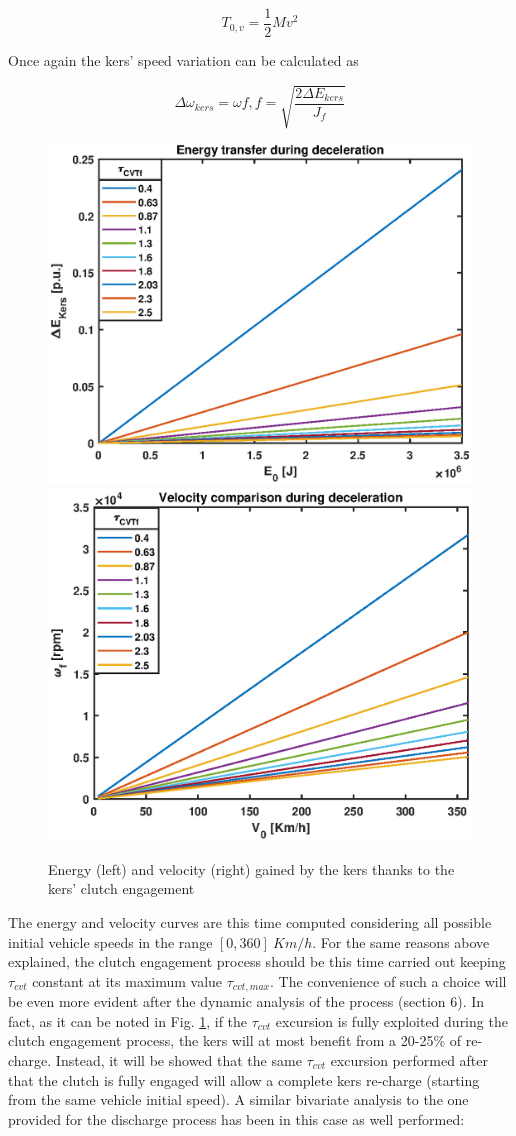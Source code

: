 \documentclass[11pt]{article}
\begin{document}
\begin{equation}
T_{0,v} = \frac{1}{2}Mv^2
\end{equation} 

Once again the kers' speed variation can be calculated as 


\begin{equation}
\Delta \omega_{kers} = \omega f,f = \sqrt{\frac{2\Delta E_{kers}}{J_f}}
\end{equation}

\begin{figure}[H]
\captionsetup{font=small, justification=centering}
\centering
\includegraphics[width=.49\textwidth]{Images/Results_new/Univariate_SteadyState/en_comp_dec.eps}\hfill
\includegraphics[width=.49\textwidth]{Images/Results_new/Univariate_SteadyState/vel_comp_dec.eps}
\caption{Energy (left) and velocity (right) gained by the kers thanks to the kers' clutch engagement}
\label{en_comp_dec}
\end{figure}

The energy and velocity curves are this time computed considering all possible initial vehicle speeds in the range $[0, 360]\ Km/h$. For the same reasons above explained, the clutch engagement process should be this time carried out keeping $\tau_{cvt}$ constant at its maximum value $\tau_{cvt,max}$. The convenience of such a choice will be even more evident after the dynamic analysis of the process (section 6). In fact, as it can be noted in Fig. \ref{en_comp_dec}, if the $\tau_{cvt}$ excursion is fully exploited during the clutch engagement process, the kers will at most benefit from a 20-25\% of re-charge. Instead, it will be showed that the same $\tau_{cvt}$ excursion performed after that the clutch is fully engaged will allow a complete kers re-charge (starting from the same vehicle initial speed).
A similar bivariate analysis to the one provided for the discharge process has been in this case as well performed:
\end{document}
